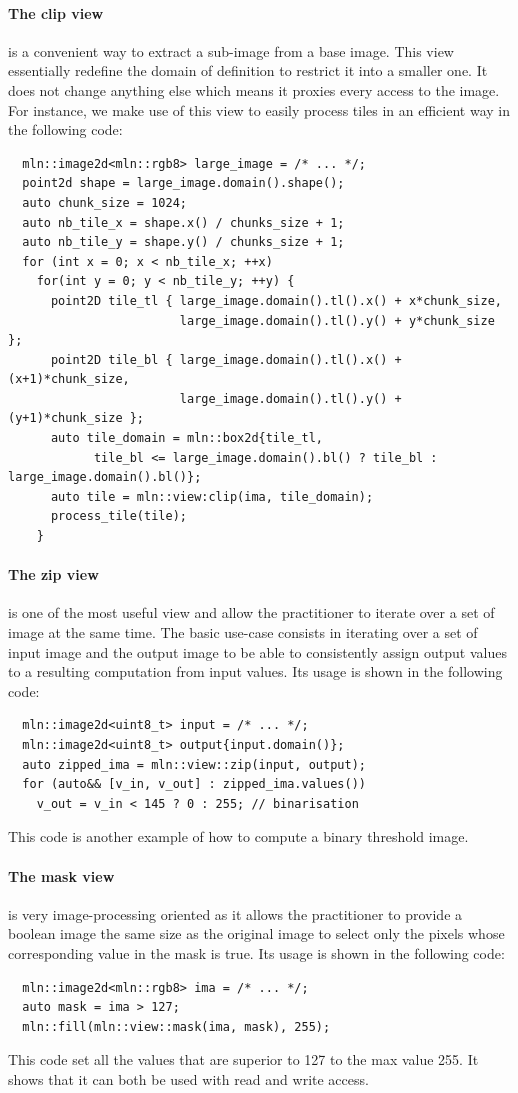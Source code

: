 \paragraph{The clip view} is a convenient way to extract a sub-image from a base image. This view essentially redefine
the domain of definition to restrict it into a smaller one. It does not change anything else which means it proxies
every access to the image. For instance, we make use of this view to easily process tiles in an efficient way in the
following code:
\begin{verbatim}
  mln::image2d<mln::rgb8> large_image = /* ... */;
  point2d shape = large_image.domain().shape();
  auto chunk_size = 1024;
  auto nb_tile_x = shape.x() / chunks_size + 1;
  auto nb_tile_y = shape.y() / chunks_size + 1;
  for (int x = 0; x < nb_tile_x; ++x)
    for(int y = 0; y < nb_tile_y; ++y) {
      point2D tile_tl { large_image.domain().tl().x() + x*chunk_size,
                        large_image.domain().tl().y() + y*chunk_size };
      point2D tile_bl { large_image.domain().tl().x() + (x+1)*chunk_size,
                        large_image.domain().tl().y() + (y+1)*chunk_size };
      auto tile_domain = mln::box2d{tile_tl,
            tile_bl <= large_image.domain().bl() ? tile_bl : large_image.domain().bl()};
      auto tile = mln::view:clip(ima, tile_domain);
      process_tile(tile);
    }
\end{verbatim}

\paragraph{The zip view} is one of the most useful view and allow the practitioner to iterate over a set of image at the
same time. The basic use-case consists in iterating over a set of input image and the output image to be able to
consistently assign output values to a resulting computation from input values. Its usage is shown in the following
code:
\begin{verbatim}
  mln::image2d<uint8_t> input = /* ... */;
  mln::image2d<uint8_t> output{input.domain()};
  auto zipped_ima = mln::view::zip(input, output);
  for (auto&& [v_in, v_out] : zipped_ima.values())
    v_out = v_in < 145 ? 0 : 255; // binarisation
\end{verbatim}
This code is another example of how to compute a binary threshold image.

\paragraph{The mask view} is very image-processing oriented as it allows the practitioner to provide a boolean image the
same size as the original image to select only the pixels whose corresponding value in the mask is true. Its usage is
shown in the following code:
\begin{verbatim}
  mln::image2d<mln::rgb8> ima = /* ... */;
  auto mask = ima > 127;
  mln::fill(mln::view::mask(ima, mask), 255);
\end{verbatim}
This code set all the values that are superior to 127 to the max value 255. It shows that it can both be used with read
and write access.

